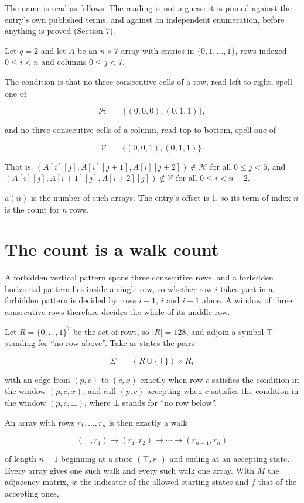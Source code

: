 \documentclass[11pt]{article}
\theoremstyle{definition}
\begin{document}
The name is read as follows. The reading is not a guess: it is pinned against the entry's own published terms, and against an independent enumeration, before anything is proved (Section 7).

Let $q = 2$ and let $A$ be an $n \times 7$ array with entries in $\{0,1,\dots,1\}$, rows indexed $0 \le i < n$ and columns $0 \le j < 7$.

The condition is that no three consecutive cells of a row, read left to right, spell one of

\[\mathcal{H} \;=\; \{(0,0,0), (0,1,1)\},\]

and no three consecutive cells of a column, read top to bottom, spell one of

\[\mathcal{V} \;=\; \{(0,0,1), (0,1,1)\}.\]

That is, $(A[i][j],A[i][j{+}1],A[i][j{+}2]) \notin \mathcal{H}$ for all $0 \le j < 5$, and $(A[i][j],A[i{+}1][j],A[i{+}2][j]) \notin \mathcal{V}$ for all $0 \le i < n-2$.

$a(n)$ is the number of such arrays. The entry's offset is 1, so its term of index $n$ is the count for $n$ rows.

\section{The count is a walk count}

A forbidden vertical pattern spans three consecutive rows, and a forbidden horizontal pattern lies inside a single row, so whether row $i$ takes part in a forbidden pattern is decided by rows $i-1$, $i$ and $i+1$ alone. A window of three consecutive rows therefore decides the whole of its middle row.

Let $R = \{0,\dots,1\}^{7}$ be the set of rows, so $|R| = 128$, and adjoin a symbol $\top$ standing for ``no row above''. Take as states the pairs

\[\Sigma \;=\; (R \cup \{\top\}) \times R,\]

with an edge from $(p,c)$ to $(c,x)$ exactly when row $c$ satisfies the condition in the window $(p,c,x)$, and call $(p,c)$ accepting when $c$ satisfies the condition in the window $(p,c,\bot)$, where $\bot$ stands for ``no row below''.

An array with rows $r_1,\dots,r_n$ is then exactly a walk

\[(\top,r_1) \to (r_1,r_2) \to \cdots \to (r_{n-1},r_n)\]

of length $n-1$ beginning at a state $(\top,r_1)$ and ending at an accepting state. Every array gives one such walk and every such walk one array. With $M$ the adjacency matrix, $w$ the indicator of the allowed starting states and $f$ that of the accepting ones,
\end{document}
